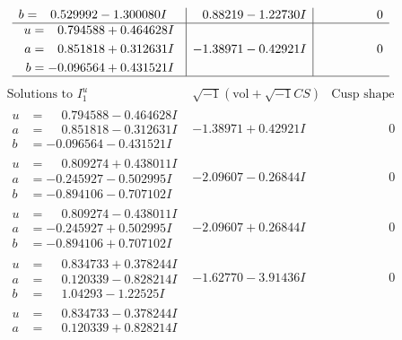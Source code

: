 \documentclass[1p]{elsarticle_modified}
\theoremstyle{definition}
\newcommand{\I}{\sqrt{-1}}
\begin{document}
$$\begin{array}{c|c|c}
\begin{aligned}
b &= \phantom{-}0.529992 - 1.300080 I\end{aligned}
 & \phantom{-}0.88219 - 1.22730 I & \phantom{-0.000000 } 0 \\ \hline\begin{aligned}
u &= \phantom{-}0.794588 + 0.464628 I \\
a &= \phantom{-}0.851818 + 0.312631 I \\
b &= -0.096564 + 0.431521 I\end{aligned}
 & -1.38971 - 0.42921 I & \phantom{-0.000000 } 0\\
 \hline 
 \end{array}$$\newpage$$\begin{array}{c|c|c}  
\text{Solutions to }I^u_{1}& \I (\text{vol} + \sqrt{-1}CS) & \text{Cusp shape}\\
 \hline 
\begin{aligned}
u &= \phantom{-}0.794588 - 0.464628 I \\
a &= \phantom{-}0.851818 - 0.312631 I \\
b &= -0.096564 - 0.431521 I\end{aligned}
 & -1.38971 + 0.42921 I & \phantom{-0.000000 } 0 \\ \hline\begin{aligned}
u &= \phantom{-}0.809274 + 0.438011 I \\
a &= -0.245927 - 0.502995 I \\
b &= -0.894106 - 0.707102 I\end{aligned}
 & -2.09607 - 0.26844 I & \phantom{-0.000000 } 0 \\ \hline\begin{aligned}
u &= \phantom{-}0.809274 - 0.438011 I \\
a &= -0.245927 + 0.502995 I \\
b &= -0.894106 + 0.707102 I\end{aligned}
 & -2.09607 + 0.26844 I & \phantom{-0.000000 } 0 \\ \hline\begin{aligned}
u &= \phantom{-}0.834733 + 0.378244 I \\
a &= \phantom{-}0.120339 - 0.828214 I \\
b &= \phantom{-}1.04293 - 1.22525 I\end{aligned}
 & -1.62770 - 3.91436 I & \phantom{-0.000000 } 0 \\ \hline\begin{aligned}
u &= \phantom{-}0.834733 - 0.378244 I \\
a &= \phantom{-}0.120339 + 0.828214 I \\

\end{aligned}
\end{array}$$
\end{document}
